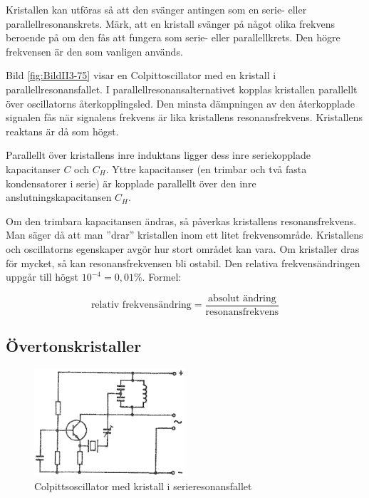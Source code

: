 Kristallen kan utföras så att den svänger antingen som en serie- eller
parallellresonanskrets.
Märk, att en kristall svänger på något olika frekvens beroende på om den fås
att fungera som serie- eller parallellkrets.
Den högre frekvensen är den som vanligen används.

Bild \ref{fig:BildII3-75} visar en Colpittoscillator med en kristall i
parallellresonansfallet.
I parallellresonansalternativet kopplas kristallen parallellt över
oscillatorns återkopplingsled.
Den minsta dämpningen av den återkopplade signalen fås när signalens frekvens
är lika kristallens resonansfrekvens.
Kristallens reaktans är då som högst.

Parallellt över kristallens inre induktans ligger dess inre
seriekopplade kapacitanser \(C\) och \(C_H\).
Yttre kapacitanser (en trimbar och två fasta kondensatorer i serie) är kopplade
parallellt över den inre anslutningskapacitansen \(C_H\).

Om den trimbara kapacitansen ändras, så påverkas kristallens resonansfrekvens.
Man säger då att man ''drar'' kristallen inom ett litet frekvensområde.
Kristallens och oscillatorns egenskaper avgör hur stort området kan vara.
Om kristaller dras för mycket, så kan resonansfrekvensen bli ostabil.
Den relativa frekvensändringen uppgår till högst \(10^{-4} = 0,01\%\).
Formel:

\[
\text{relativ frekvensändring} =
\frac{\text{absolut ändring}}{\text{resonansfrekvens}}
\]

\subsection{Övertonskristaller}

\begin{figure}
\includegraphics[width=0.5\textwidth]{images/cropped_pdfs/bild_2_3-76.pdf}
\caption{Colpittsoscillator med kristall i serieresonansfallet}
\label{fig:BildII3-76}
\end{figure}

